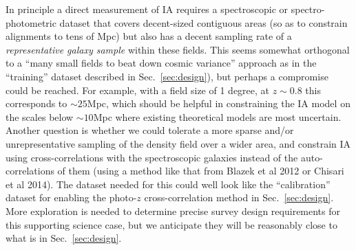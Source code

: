 In principle a direct measurement of IA requires a spectroscopic or spectro-photometric dataset that covers decent-sized
contiguous areas (so as to constrain alignments to tens of Mpc) but also has a decent sampling rate
of a {\em representative galaxy sample} within these fields.  This seems somewhat orthogonal to a
``many small fields to beat down cosmic variance'' approach as in the ``training'' dataset described in
Sec.~\ref{sec:design}), but perhaps a compromise could be reached. For example, with a field
size of 1 degree, at $z\sim 0.8$ this corresponds to $\sim 25$Mpc, which should be helpful in
constraining the IA model on the scales below $\sim 10$Mpc where existing theoretical models are
most uncertain. Another question is whether
we could tolerate a more sparse and/or unrepresentative sampling of the density field over a wider
area, and constrain IA using cross-correlations with the spectroscopic galaxies instead of the
auto-correlations of them (using a method like that from Blazek et al 2012 or Chisari et al 2014).
The dataset needed for this could well look like  the ``calibration'' dataset for enabling the
photo-$z$ cross-correlation method in Sec.~\ref{sec:design}. More exploration is needed to determine
precise survey design requirements for this supporting science case, but we anticipate they will be
reasonably close to what is in Sec.~\ref{sec:design}.

